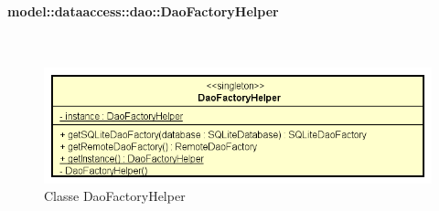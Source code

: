 \documentclass[../DefinizioneDiProdotto.tex]{subfiles}
\begin{document}
\paragraph{model::dataaccess::dao::DaoFactoryHelper}
\
\begin{figure}[H]
	\centering
	\includegraphics[width=\maxwidth]{img/DaoFactoryHelper.png}
	\caption{Classe DaoFactoryHelper}\label{fig:model::dataaccess::dao::DaoFactoryHelper} 
\end{figure}
\end{document}
